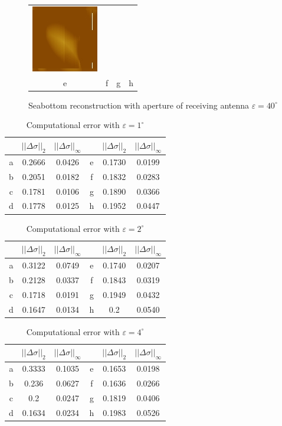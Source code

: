 \documentclass{procDDs}
\begin{document}
\begin{figure}[h!]
\begin{tabular}{cccc}
		\includegraphics[width=0.2\linewidth]{img/17/12.jpg}\\
		e & f & g & h
	\end{tabular}
	\caption{Seabottom reconstruction with aperture of receiving antenna $\varepsilon=40^\circ$}
	\label{ris:desc6}
\end{figure}
\begin{table}[h!]
	\begin{tabular}{|c|c|c||c|c|c|}
		\hline
		& $||\Delta\sigma||_2$ & $||\Delta\sigma||_\infty$ &
		& $||\Delta\sigma||_2$ & $||\Delta\sigma||_\infty$ \\ \hline
		a & 0.2666 & 0.0426 & e &  0.1730 & 0.0199\\ \hline
		b & 0.2051 & 0.0182 & f &  0.1832 & 0.0283\\ \hline
		c & 0.1781 & 0.0106 & g &  0.1890 & 0.0366\\ \hline
		d & 0.1778 & 0.0125 & h &  0.1952 & 0.0447\\ \hline
	\end{tabular}
	\label{table:desc1}
	\caption{Computational error with $\varepsilon=1^\circ$}
\end{table}
\begin{table}[h!]
	\begin{tabular}{|c|c|c||c|c|c|}
		\hline
		& $||\Delta\sigma||_2$ & $||\Delta\sigma||_\infty$ &
		& $||\Delta\sigma||_2$ & $||\Delta\sigma||_\infty$ \\ \hline
		a & 0.3122 & 0.0749 & e &  0.1740 & 0.0207\\ \hline
		b & 0.2128 & 0.0337 & f &  0.1843 & 0.0319\\ \hline
		c & 0.1718 & 0.0191 & g &  0.1949 & 0.0432\\ \hline
		d & 0.1647 & 0.0134 & h &  0.2 & 0.0540\\ \hline
	\end{tabular}
	\label{table:desc2}
	\caption{Computational error with $\varepsilon=2^\circ$}	
\end{table}
\begin{table}[h!]
	\begin{tabular}{|c|c|c||c|c|c|}
		\hline
		& $||\Delta\sigma||_2$ & $||\Delta\sigma||_\infty$ &
		& $||\Delta\sigma||_2$ & $||\Delta\sigma||_\infty$ \\ \hline
		a & 0.3333 & 0.1035 & e &  0.1653 & 0.0198\\ \hline
		b & 0.236 & 0.0627 & f &  0.1636 & 0.0266\\ \hline
		c & 0.2 & 0.0247 & g &  0.1819 & 0.0406\\ \hline
		d & 0.1634 & 0.0234 & h &  0.1983 & 0.0526\\ \hline
	\end{tabular}
	\label{table:desc3}
	\caption{Computational error with $\varepsilon=4^\circ$}	
\end{table}
\end{document}
